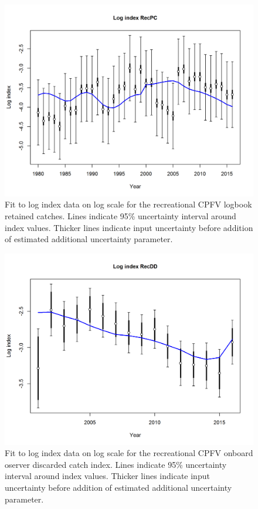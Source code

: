 \documentclass[12pt,]{article}
\begin{document}
\FloatBarrier

\begin{figure}[htbp]
\centering
\includegraphics{r4ss/plots_mod1/index5_logcpuefit_RecPC.png}
\caption{Fit to log index data on log scale for the recreational CPFV
logbook retained catches. Lines indicate 95\% uncertainty interval
around index values. Thicker lines indicate input uncertainty before
addition of estimated additional uncertainty parameter.
\label{fig:index5_logcpuefit_RecPC}}
\end{figure}

\FloatBarrier

\begin{figure}[htbp]
\centering
\includegraphics{r4ss/plots_mod1/index5_logcpuefit_RecDD.png}
\caption{Fit to log index data on log scale for the recreational CPFV
onboard oserver discarded catch index. Lines indicate 95\% uncertainty
interval around index values. Thicker lines indicate input uncertainty
before addition of estimated additional uncertainty parameter.
\label{fig:index5_logcpuefit_RecDD}}
\end{figure}
\end{document}
